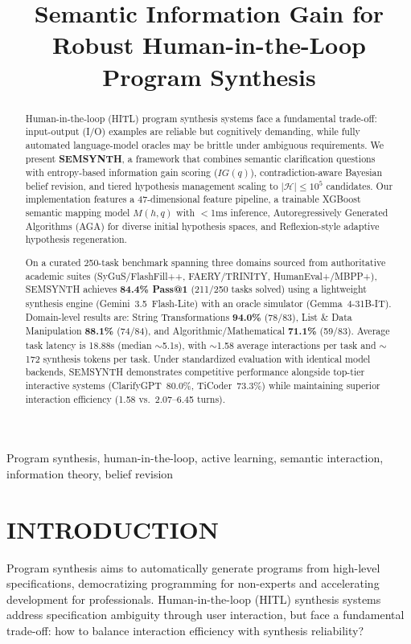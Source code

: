\documentclass[10pt,conference]{IEEEtran}
\title{Semantic Information Gain for Robust Human-in-the-Loop Program Synthesis}
\author{\IEEEauthorblockN{Anonymous Authors}
\IEEEauthorblockA{\textit{Under Review for ICSE 2027}}}
\begin{document}
\maketitle

\begin{abstract}
Human-in-the-loop (HITL) program synthesis systems face a fundamental trade-off: input-output (I/O) examples are reliable but cognitively demanding, while fully automated language-model oracles may be brittle under ambiguous requirements. We present \textbf{SEMSYNTH}, a framework that combines semantic clarification questions with entropy-based information gain scoring ($IG(q)$), contradiction-aware Bayesian belief revision, and tiered hypothesis management scaling to $|\mathcal{H}| \leq 10^5$ candidates. Our implementation features a 47-dimensional feature pipeline, a trainable XGBoost semantic mapping model $M(h,q)$ with $<$1ms inference, Autoregressively Generated Algorithms (AGA) for diverse initial hypothesis spaces, and Reflexion-style adaptive hypothesis regeneration.

On a curated 250-task benchmark spanning three domains sourced from authoritative academic suites (SyGuS/FlashFill++, FAERY/TRINITY, HumanEval+/MBPP+), SEMSYNTH achieves \textbf{84.4\% Pass@1} (211/250 tasks solved) using a lightweight synthesis engine (Gemini~3.5~Flash-Lite) with an oracle simulator (Gemma~4-31B-IT). Domain-level results are: String Transformations \textbf{94.0\%} (78/83), List \& Data Manipulation \textbf{88.1\%} (74/84), and Algorithmic/Mathematical \textbf{71.1\%} (59/83). Average task latency is 18.88s (median $\sim$5.1s), with $\sim$1.58 average interactions per task and $\sim$172 synthesis tokens per task. Under standardized evaluation with identical model backends, SEMSYNTH demonstrates competitive performance alongside top-tier interactive systems (ClarifyGPT~80.0\%, TiCoder~73.3\%) while maintaining superior interaction efficiency (1.58 vs.~2.07--6.45 turns).
\end{abstract}

\begin{IEEEkeywords}
Program synthesis, human-in-the-loop, active learning, semantic interaction, information theory, belief revision
\end{IEEEkeywords}

\section{INTRODUCTION}

Program synthesis aims to automatically generate programs from high-level specifications, democratizing programming for non-experts and accelerating development for professionals. Human-in-the-loop (HITL) synthesis systems address specification ambiguity through user interaction, but face a fundamental trade-off: how to balance interaction efficiency with synthesis reliability?
\end{document}
